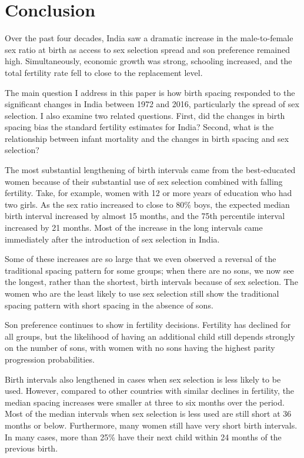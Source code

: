 \documentclass[12pt,letterpaper]{article}
\begin{document}
\section{Conclusion\label{sec:conclusion}}

Over the past four decades, India saw a dramatic increase in the male-to-female
sex ratio at birth as access to sex selection spread and son preference remained high. 
Simultaneously, economic growth was strong, schooling increased, and the total
fertility rate fell to close to the replacement level.

The main question I address in this paper is how birth spacing responded to the 
significant changes in India between 1972 and 2016, particularly the spread of sex 
selection.
I also examine two related questions.
First, did the changes in birth spacing bias the standard fertility estimates for India? 
Second, what is the relationship between infant mortality and the changes in birth spacing 
and sex selection?


The most substantial lengthening of birth intervals came from the best-educated women
because of their substantial use of sex selection combined with falling fertility.
Take, for example, women with 12 or more years of education who had two girls. 
As the sex ratio increased to close to 80\% boys, the expected median birth interval 
increased by almost 15 months, and the 75th percentile interval increased by 21 months.
Most of the increase in the long intervals came immediately after the introduction of sex 
selection in India.

Some of these increases are so large that we even observed a reversal of the traditional 
spacing pattern for some groups; when there are no sons, we now see the longest, rather 
than the shortest, birth intervals because of sex selection.
The women who are the least likely to use sex selection still show the traditional 
spacing pattern with short spacing in the absence of sons.

Son preference continues to show in fertility decisions. 
Fertility has declined for all groups, but the likelihood of having an additional child
still depends strongly on the number of sons, with women with no sons having the highest 
parity progression probabilities.

Birth intervals also lengthened in cases when sex selection is less likely to be used. 
However, compared to other countries with similar declines in fertility, the median 
spacing increases were smaller at three to six months over the period. 
Most of the median intervals when sex selection is less used are still short at 36 months 
or below. 
Furthermore, many women still have very short birth intervals. 
In many cases, more than 25\% have their next child within 24 months of the previous 
birth.  
\end{document}
